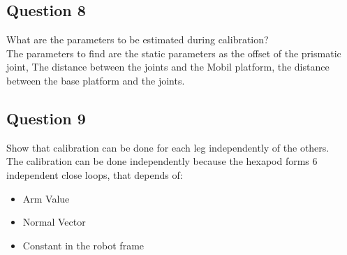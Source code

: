 \documentclass[12pt, twoside]{report}
\begin{document}
\subsection{Question 8}
What are the parameters to be estimated during calibration?\\
The parameters to find are the static parameters as the offset of the prismatic joint, The distance between the joints and the Mobil platform, the distance between the base platform and the joints.
\subsection{Question 9}
Show that calibration can be done for each leg independently of the others. \\
The calibration can be done independently because the hexapod forms 6 independent close loops, that depends of:
\begin{itemize}
    \item Arm Value
    \item Normal Vector
    \item Constant in the robot frame
\end{itemize}
\end{document}
